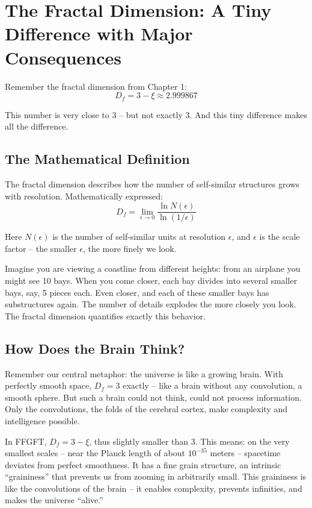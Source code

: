 \section{The Fractal Dimension: A Tiny Difference with Major Consequences}

Remember the fractal dimension from Chapter 1:
\begin{equation}
D_f = 3 - \xi \approx 2.999867
\end{equation}

This number is very close to 3 -- but not exactly 3. And this tiny difference makes all the difference.

\subsection{The Mathematical Definition}

The fractal dimension describes how the number of self-similar structures grows with resolution. Mathematically expressed:
\begin{equation}
D_f = \lim_{\epsilon \to 0} \frac{\ln N(\epsilon)}{\ln(1/\epsilon)}
\end{equation}

Here $N(\epsilon)$ is the number of self-similar units at resolution $\epsilon$, and $\epsilon$ is the scale factor -- the smaller $\epsilon$, the more finely we look.

Imagine you are viewing a coastline from different heights: from an airplane you might see 10 bays. When you come closer, each bay divides into several smaller bays, say, 5 pieces each. Even closer, and each of these smaller bays has substructures again. The number of details explodes the more closely you look. The fractal dimension quantifies exactly this behavior.

\subsection{How Does the Brain Think?}

Remember our central metaphor: the universe is like a growing brain. With perfectly smooth space, $D_f = 3$ exactly -- like a brain without any convolution, a smooth sphere. But such a brain could not think, could not process information. Only the convolutions, the folds of the cerebral cortex, make complexity and intelligence possible.

In FFGFT, $D_f = 3 - \xi$, thus slightly smaller than 3. This means: on the very smallest scales -- near the Planck length of about $10^{-35}$ meters -- spacetime deviates from perfect smoothness. It has a fine grain structure, an intrinsic ``graininess'' that prevents us from zooming in arbitrarily small. This graininess is like the convolutions of the brain -- it enables complexity, prevents infinities, and makes the universe ``alive.''

